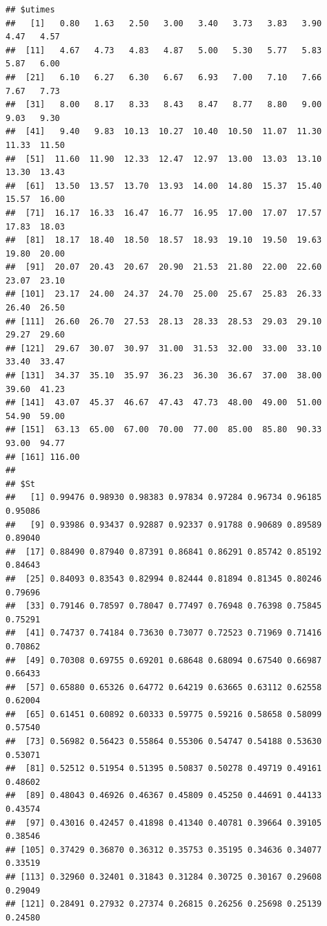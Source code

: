 \documentclass{article}\usepackage[]{graphicx}\usepackage[]{color}
\makeatletter
\newenvironment{kframe}{%
 \def\at@end@of@kframe{}%
 \ifinner\ifhmode%
  \def\at@end@of@kframe{\end{minipage}}%
  \begin{minipage}{\columnwidth}%
 \fi\fi%
 \def\FrameCommand##1{\hskip\@totalleftmargin \hskip-\fboxsep
 \colorbox{shadecolor}{##1}\hskip-\fboxsep
     \hskip-\linewidth \hskip-\@totalleftmargin \hskip\columnwidth}%
 \MakeFramed {\advance\hsize-\width
   \@totalleftmargin\z@ \linewidth\hsize
   \@setminipage}}%
 {\par\unskip\endMakeFramed%
 \at@end@of@kframe}
\newenvironment{knitrout}{}{} %
\makeatother
\begin{document}
\begin{knitrout}
{}


\begin{kframe}\begin{verbatim}
## $utimes
##   [1]   0.80   1.63   2.50   3.00   3.40   3.73   3.83   3.90   4.47   4.57
##  [11]   4.67   4.73   4.83   4.87   5.00   5.30   5.77   5.83   5.87   6.00
##  [21]   6.10   6.27   6.30   6.67   6.93   7.00   7.10   7.66   7.67   7.73
##  [31]   8.00   8.17   8.33   8.43   8.47   8.77   8.80   9.00   9.03   9.30
##  [41]   9.40   9.83  10.13  10.27  10.40  10.50  11.07  11.30  11.33  11.50
##  [51]  11.60  11.90  12.33  12.47  12.97  13.00  13.03  13.10  13.30  13.43
##  [61]  13.50  13.57  13.70  13.93  14.00  14.80  15.37  15.40  15.57  16.00
##  [71]  16.17  16.33  16.47  16.77  16.95  17.00  17.07  17.57  17.83  18.03
##  [81]  18.17  18.40  18.50  18.57  18.93  19.10  19.50  19.63  19.80  20.00
##  [91]  20.07  20.43  20.67  20.90  21.53  21.80  22.00  22.60  23.07  23.10
## [101]  23.17  24.00  24.37  24.70  25.00  25.67  25.83  26.33  26.40  26.50
## [111]  26.60  26.70  27.53  28.13  28.33  28.53  29.03  29.10  29.27  29.60
## [121]  29.67  30.07  30.97  31.00  31.53  32.00  33.00  33.10  33.40  33.47
## [131]  34.37  35.10  35.97  36.23  36.30  36.67  37.00  38.00  39.60  41.23
## [141]  43.07  45.37  46.67  47.43  47.73  48.00  49.00  51.00  54.90  59.00
## [151]  63.13  65.00  67.00  70.00  77.00  85.00  85.80  90.33  93.00  94.77
## [161] 116.00
## 
## $St
##   [1] 0.99476 0.98930 0.98383 0.97834 0.97284 0.96734 0.96185 0.95086
##   [9] 0.93986 0.93437 0.92887 0.92337 0.91788 0.90689 0.89589 0.89040
##  [17] 0.88490 0.87940 0.87391 0.86841 0.86291 0.85742 0.85192 0.84643
##  [25] 0.84093 0.83543 0.82994 0.82444 0.81894 0.81345 0.80246 0.79696
##  [33] 0.79146 0.78597 0.78047 0.77497 0.76948 0.76398 0.75845 0.75291
##  [41] 0.74737 0.74184 0.73630 0.73077 0.72523 0.71969 0.71416 0.70862
##  [49] 0.70308 0.69755 0.69201 0.68648 0.68094 0.67540 0.66987 0.66433
##  [57] 0.65880 0.65326 0.64772 0.64219 0.63665 0.63112 0.62558 0.62004
##  [65] 0.61451 0.60892 0.60333 0.59775 0.59216 0.58658 0.58099 0.57540
##  [73] 0.56982 0.56423 0.55864 0.55306 0.54747 0.54188 0.53630 0.53071
##  [81] 0.52512 0.51954 0.51395 0.50837 0.50278 0.49719 0.49161 0.48602
##  [89] 0.48043 0.46926 0.46367 0.45809 0.45250 0.44691 0.44133 0.43574
##  [97] 0.43016 0.42457 0.41898 0.41340 0.40781 0.39664 0.39105 0.38546
## [105] 0.37429 0.36870 0.36312 0.35753 0.35195 0.34636 0.34077 0.33519
## [113] 0.32960 0.32401 0.31843 0.31284 0.30725 0.30167 0.29608 0.29049
## [121] 0.28491 0.27932 0.27374 0.26815 0.26256 0.25698 0.25139 0.24580

\end{verbatim}
\end{kframe}
\end{knitrout}
\end{document}
